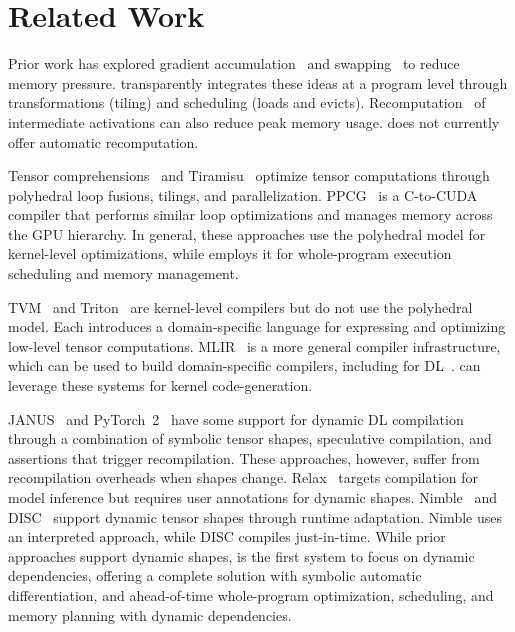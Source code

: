 
\section{Related Work}
\label{sec:rel_work}

 Prior work has explored gradient accumulation~\cite{zhao2021v} and swapping~\cite{rhu2016vdnn,huang2020swapadvisor} to reduce memory pressure. \sys transparently integrates these ideas at a program level through transformations (tiling) and scheduling (loads and evicts). Recomputation~\cite{wang2018superneurons, peng2020capuchin} of intermediate activations can also reduce peak memory usage. \sys{} does not currently offer automatic recomputation.


 Tensor comprehensions~\cite{vasilache2018tensor} and Tiramisu~\cite{baghdadi2019tiramisu} optimize tensor computations through polyhedral loop fusions, tilings, and parallelization. PPCG~\cite{verdoolaege2013polyhedral} is a C-to-CUDA compiler that performs similar loop optimizations and manages memory across the GPU hierarchy. In general, these approaches use the polyhedral model for kernel-level optimizations, while \sys{} employs it for whole-program execution scheduling and memory management.

 TVM~\cite{chen2018tvm} and Triton~\cite{tillet2019triton} are kernel-level compilers but do not use the polyhedral model. Each introduces a domain-specific language for expressing and optimizing low-level tensor computations. MLIR~\cite{Lattner_2021} is a more general compiler infrastructure, which can be used to build domain-specific compilers, including for DL~\cite{openxla2024}. \sys{} can leverage these systems for kernel code-generation.



JANUS~\cite{jeong2019speculative} and PyTorch~2~\cite{ansel2024pytorch} have some support for dynamic DL compilation through a combination of symbolic tensor shapes, speculative compilation, and assertions that trigger recompilation. These approaches, however, suffer from recompilation overheads when shapes change. Relax~\cite{lai2025relax} targets compilation for model inference but requires user annotations for dynamic shapes. 
Nimble~\cite{shen2021nimble} and DISC~\cite{zheng2023bladedisc} support dynamic tensor shapes through runtime adaptation. Nimble uses an interpreted approach, while DISC compiles just-in-time.
While prior approaches support dynamic shapes, \sys{} is the first system to focus on dynamic dependencies, offering a complete solution with symbolic automatic differentiation, and ahead-of-time whole-program optimization, scheduling, and memory planning with dynamic dependencies.


